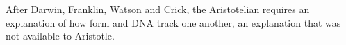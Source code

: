 After Darwin, Franklin, Watson and Crick, the Aristotelian requires an explanation of how 
form and DNA track one another, an explanation that was not available to Aristotle.

%
%
%
%

